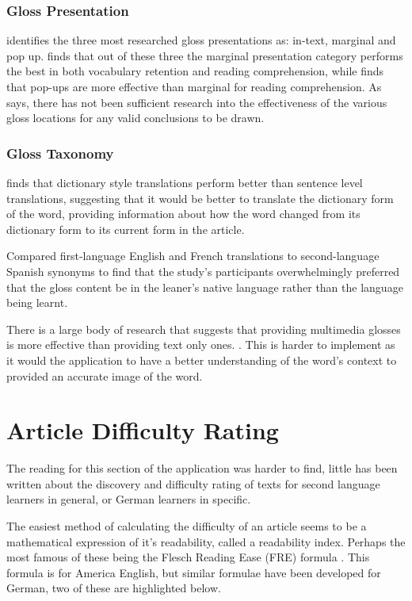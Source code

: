 \subsubsection{Gloss Presentation}

\textcite{chen2016} identifies the three most researched gloss presentations as: in-text, marginal and pop up.  \textcite{abuseileek2008} finds that out of these three the marginal presentation category performs the best in both vocabulary retention and reading comprehension, while \textcite{marefat2016} finds that pop-ups are more effective than marginal for reading comprehension. As \textcite{chen2016} says, there has not been sufficient research into the effectiveness of the various gloss locations for any valid conclusions to be drawn.

\subsubsection{Gloss Taxonomy}

\textcite{gettys2001} finds that dictionary style translations perform better than sentence level translations, suggesting that it would be better
 to translate the dictionary form of the word, providing information about how the word changed from its dictionary form to its current form in the article. 

\textcite{bell2000}  Compared first-language English and French translations to second-language Spanish synonyms to find that the study's participants overwhelmingly preferred that the gloss content be in the leaner's native language rather than the language being learnt. 

There is a large body of research that suggests that providing multimedia glosses is more effective than providing text only ones. \autocite{yoshii2006, kost1999}. This is harder to implement  as it would the application to have a better understanding of the word's context to provided an accurate image of the word. 

\section{Article Difficulty Rating}

The reading for this section of the application was harder to find, little has been written about the discovery and difficulty rating of texts for second language learners in general, or German learners in specific. 

The easiest method of calculating the difficulty of an article seems to be a mathematical expression of it's readability, called a readability index. Perhaps the most famous of these being the Flesch Reading Ease (FRE) formula \autocite{flesch1948}. This formula is for America English, but similar formulae have been developed for German, two of these are highlighted below.

